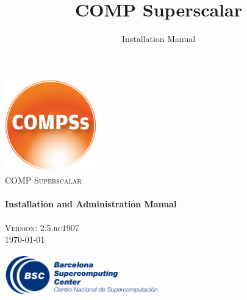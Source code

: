 \documentclass[a4paper,12pt]{article}
\title{COMP Superscalar}
\author{Installation Manual}
\def \compssversion {2.5.rc1907}
\begin{document}
  \hypersetup{pageanchor=false}
  \begin{titlepage} 
    \begin{center} 
      \includegraphics[width=0.3\textwidth]{./Figures/Logos/degradado-naranja-compss.jpg}~\\[1cm] 
      \textsc{\LARGE COMP Superscalar}\\[1.5cm] 
      
      \HRule \\[0.4cm] 
      { \huge \bfseries Installation and Administration Manual \\[0.4cm] }
      \HRule \\[1.5cm] 

      { \large \textsc{Version: \compssversion}} \\[0.3cm]
      { \large \today } 
      
      \vfill 
      \includegraphics[width=0.5\textwidth]{./Figures/bsc_280.jpg}~\\[1cm]
    \end{center} 
  \end{titlepage}
  \hypersetup{pageanchor=true}
  
\end{document}
